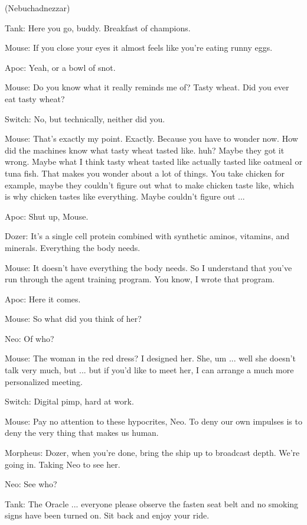\documentclass{ctexart}
\newenvironment{myquote}{\color{green} \setlength{\leftskip}{6em} \setlength{\rightskip}{4em} \setlength{\parindent}{-2em}}{\par}
\begin{document}
\begin{myquote}
(Nebuchadnezzar)

Tank: Here you go, buddy. Breakfast of champions.

Mouse: If you close your eyes it almost feels like you're eating runny eggs.

Apoc: Yeah, or a bowl of snot.

Mouse: Do you know what it really reminds me of? Tasty wheat. Did you ever eat tasty wheat?

Switch: No, but technically, neither did you.

Mouse: That's exactly my point. Exactly. Because you have to wonder now. How did the machines know what tasty wheat tasted like. huh? Maybe they got it wrong. Maybe what I think tasty wheat tasted like actually tasted like oatmeal or tuna fish. That makes you wonder about a lot of things. You take chicken for example, maybe they couldn't figure out what to make chicken taste like, which is why chicken tastes like everything. Maybe couldn't figure out ...

Apoc: Shut up, Mouse.

Dozer: It's a single cell protein combined with synthetic aminos, vitamins, and minerals. Everything the body needs.

Mouse: It doesn't have everything the body needs. So I understand that you've run through the agent training program. You know, I wrote that program.

Apoc: Here it comes.

Mouse: So what did you think of her?

Neo: Of who?

Mouse: The woman in the red dress? I designed her. She, um ... well she doesn't talk very much, but ... but if you'd like to meet her, I can arrange a much more personalized meeting.

Switch: Digital pimp, hard at work.

Mouse: Pay no attention to these hypocrites, Neo. To deny our own impulses is to deny the very thing that makes us human.

Morpheus: Dozer, when you're done, bring the ship up to broadcast depth. We're going in. Taking Neo to see her.

Neo: See who?

Tank: The Oracle ... everyone please observe the fasten seat belt and no smoking signs have been turned on. Sit back and enjoy your ride.
\end{myquote}
\end{document}
